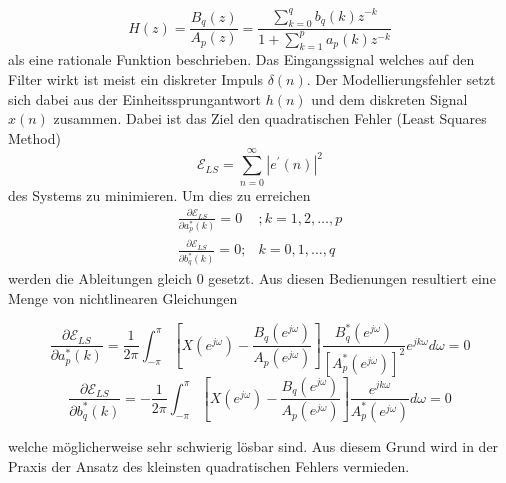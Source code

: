 \begin{equation}
H(z)
=
\frac{B_{q}(z)}{A_{p}(z)}
=
\frac{\sum_{k=0}^{q} b_{q}(k) z^{-k}}{1+\sum_{k=1}^{p} a_{p}(k) z^{-k}}
\end{equation}
als eine rationale Funktion beschrieben.
Das Eingangssignal welches auf den Filter wirkt ist meist ein diskreter Impuls $\delta(n)$.
Der Modellierungsfehler setzt sich dabei aus der Einheitssprungantwort $h(n)$ und dem diskreten Signal $x(n)$ zusammen.
Dabei ist das Ziel den quadratischen Fehler (Least Squares Method)
\begin{equation}
\mathcal{E}_{L S}
=
\sum_{n=0}^{\infty}\left|e^{\prime}(n)\right|^{2}
\end{equation}
des Systems zu minimieren.
Um dies zu erreichen   
\begin{equation}\begin{array}{ll}
\frac{\partial \mathcal{E}_{L S}}{\partial a_{p}^{*}(k)}
=
0 
& 
; k=1,2, \ldots, p \\
\frac{\partial \mathcal{E}_{L S}}{\partial b_{q}^{*}(k)}
=
0 ; 
&
 k=0,1, \ldots, q
\end{array}\end{equation}
werden die Ableitungen gleich 0 gesetzt.
Aus diesen Bedienungen resultiert eine Menge von nichtlinearen Gleichungen 

\begin{equation}
\frac{\partial \mathcal{E}_{L S}}{\partial a_{p}^{*}(k)}
=
\frac{1}{2 \pi} 
\int_{-\pi}^{\pi}
\left[X\left(e^{j \omega}\right)-\frac{B_{q}\left(e^{j \omega}\right)}{A_{p}\left(e^{j \omega}\right)}\right] 
\frac{B_{q}^{*}\left(e^{j \omega}\right)}{\left[A_{p}^{*}\left(e^{j \omega}\right)\right]^{2}} 
e^{j k \omega} d \omega
=
0
\end{equation}
\begin{equation}
\frac{\partial \mathcal{E}_{L S}}{\partial b_{q}^{*}(k)}
=
-\frac{1}{2 \pi} 
\int_{-\pi}^{\pi}
\left[X\left(e^{j \omega}\right)-\frac{B_{q}\left(e^{j \omega}\right)}{A_{p}\left(e^{j \omega}\right)}\right] 
\frac{e^{j k \omega}}{A_{p}^{*}\left(e^{j \omega}\right)} d \omega
=
0
\end{equation}

welche möglicherweise sehr schwierig lösbar sind.
Aus diesem Grund wird in der Praxis der Ansatz des kleinsten quadratischen Fehlers vermieden. 


\begin{figure}
	\centering
	\tikzset{>=latex}
\end{figure}






